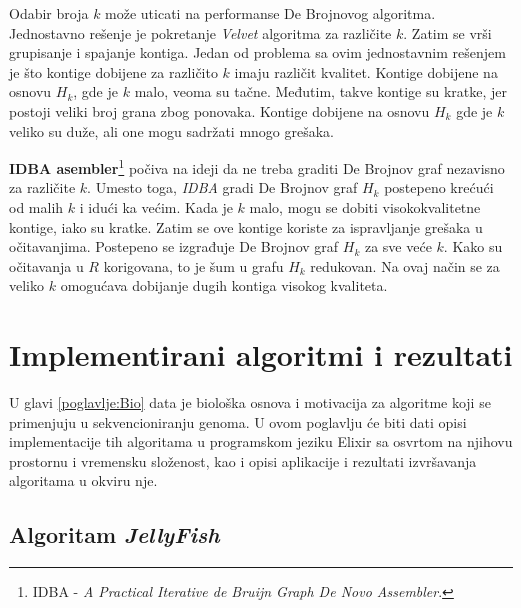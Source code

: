 \documentclass[12pt,oneside]{memoir}
\begin{document}
Odabir broja $k$ može uticati na performanse De Brojnovog algoritma. Jednostavno rešenje je pokretanje \textit{Velvet} algoritma za različite $k$. Zatim se vrši grupisanje i spajanje kontiga. Jedan od problema sa ovim jednostavnim rešenjem je što kontige dobijene za različito $k$ imaju različit kvalitet. Kontige dobijene na osnovu $H_k$, gde je $k$ malo, veoma su tačne. Međutim, takve kontige su kratke, jer postoji veliki broj grana zbog ponovaka. Kontige dobijene na osnovu $H_k$ gde je $k$ veliko su duže, ali one mogu sadržati mnogo grešaka.

\textbf{IDBA asembler}\footnote{IDBA - \textit{A Practical Iterative de Bruijn Graph De Novo Assembler}.} počiva na ideji da ne treba graditi De Brojnov graf nezavisno za različite $k$. Umesto toga, \textit{IDBA} gradi De Brojnov graf $H_k$ postepeno krećući od malih $k$ i idući ka većim. Kada je $k$ malo, mogu se dobiti visokokvalitetne kontige, iako su kratke. Zatim se ove kontige koriste za ispravljanje grešaka u očitavanjima. Postepeno se izgrađuje De Brojnov graf $H_k$ za sve veće $k$. Kako su očitavanja u $R$ korigovana, to je šum u grafu $H_k$ redukovan. Na ovaj način se za veliko $k$ omogućava dobijanje dugih kontiga visokog kvaliteta. 

\begin{comment}

Na slici \ref{fig:17} se nalazi pseudokod koji opisuje ideju IDBA asemblera.

\begin{figure}[!ht]
\centering
\texttt{[image: Figura5\_24.PNG]}
\caption{IDBA \cite{WingKinSung}}
\label{fig:17}
\end{figure}

\end{comment}

\chapter{Implementirani algoritmi i rezultati}
\label{odeljak:algoritmiIRezultati}

U glavi \ref{poglavlje:Bio} data je biološka osnova i motivacija za algoritme koji se primenjuju u sekvencioniranju genoma. U ovom poglavlju će biti dati opisi implementacije tih algoritama u programskom jeziku Elixir sa osvrtom na njihovu prostornu i vremensku složenost, kao i opisi aplikacije i rezultati izvršavanja algoritama u okviru nje.

\section{Algoritam \textit{JellyFish}}
\label{odeljak:JellyFish}
\end{document}
